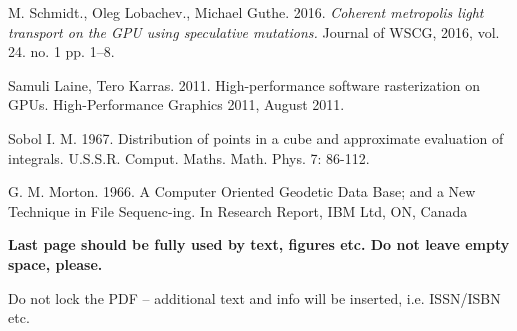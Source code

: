 \documentclass[twoside,twocolumn,10pt]{article}
\begin{document}
\begin{thebibliography}{99}
 M. Schmidt., Oleg Lobachev., Michael Guthe. 2016. \textit{Coherent metropolis light transport on the GPU using speculative mutations.} Journal of WSCG, 2016, vol. 24. no. 1 pp. 1--8.

 Samuli Laine, Tero Karras. 2011. High-performance software rasterization on GPUs. High-Performance Graphics 2011, August 2011. 

 Sobol I. M. 1967. Distribution of points in a cube and approximate evaluation of integrals. U.S.S.R. Comput. Maths. Math. Phys. 7: 86-112. 

 G. M. Morton. 1966. A Computer Oriented Geodetic Data Base; and a New Technique in File Sequenc-ing. In Research Report, IBM Ltd, ON, Canada

\end{thebibliography}

{\bfseries
Last page should be fully used by text, figures etc. Do not leave empty space, please. 

Do not lock the PDF -- additional text and info will be inserted, i.e. ISSN/ISBN etc. 
}
\end{document}
